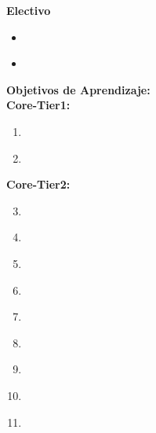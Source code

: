 \noindent \textbf{Electivo}
\begin{itemize}
	\item \PDCommunicationandCoordinationTopicConsensus\label{sec:BOK:PDCommunicationandCoordinationTopicConsensus}
	\item \PDCommunicationandCoordinationTopicConditional\label{sec:BOK:PDCommunicationandCoordinationTopicConditional}
\end{itemize}


\noindent \textbf{Objetivos de Aprendizaje:}\\
\noindent \textbf{Core-Tier1:}
\begin{enumerate}
	\setcounter{enumi}{0}
	\item \PDCommunicationandCoordinationLOUseMutual\xspace[\PDCommunicationandCoordinationLOUseMutualLevel]\label{sec:BOK:PDCommunicationandCoordinationLOUseMutual}
	\item \PDCommunicationandCoordinationLOGiveAn\xspace[\PDCommunicationandCoordinationLOGiveAnLevel]\label{sec:BOK:PDCommunicationandCoordinationLOGiveAn}
\end{enumerate}
\noindent \textbf{Core-Tier2:}
\begin{enumerate}
	\setcounter{enumi}{2}
	\item \PDCommunicationandCoordinationLOGiveAnA\xspace[\PDCommunicationandCoordinationLOGiveAnALevel]\label{sec:BOK:PDCommunicationandCoordinationLOGiveAnA}
	\item \PDCommunicationandCoordinationLOExplainWhenMulticast\xspace[\PDCommunicationandCoordinationLOExplainWhenMulticastLevel]\label{sec:BOK:PDCommunicationandCoordinationLOExplainWhenMulticast}
	\item \PDCommunicationandCoordinationLOWriteACorrectly\xspace[\PDCommunicationandCoordinationLOWriteACorrectlyLevel]\label{sec:BOK:PDCommunicationandCoordinationLOWriteACorrectly}
	\item \PDCommunicationandCoordinationLOUseAQueue\xspace[\PDCommunicationandCoordinationLOUseAQueueLevel]\label{sec:BOK:PDCommunicationandCoordinationLOUseAQueue}
	\item \PDCommunicationandCoordinationLOExplainWhyPreconditions\xspace[\PDCommunicationandCoordinationLOExplainWhyPreconditionsLevel]\label{sec:BOK:PDCommunicationandCoordinationLOExplainWhyPreconditions}
	\item \PDCommunicationandCoordinationLOWriteAThat\xspace[\PDCommunicationandCoordinationLOWriteAThatLevel]\label{sec:BOK:PDCommunicationandCoordinationLOWriteAThat}
	\item \PDCommunicationandCoordinationLODescribeAtDesign\xspace[\PDCommunicationandCoordinationLODescribeAtDesignLevel]\label{sec:BOK:PDCommunicationandCoordinationLODescribeAtDesign}
	\item \PDCommunicationandCoordinationLODescribeTheOfConservative\xspace[\PDCommunicationandCoordinationLODescribeTheOfConservativeLevel]\label{sec:BOK:PDCommunicationandCoordinationLODescribeTheOfConservative}
	\item \PDCommunicationandCoordinationLOGiveAnAWhich\xspace[\PDCommunicationandCoordinationLOGiveAnAWhichLevel]\label{sec:BOK:PDCommunicationandCoordinationLOGiveAnAWhich}
\end{enumerate}
